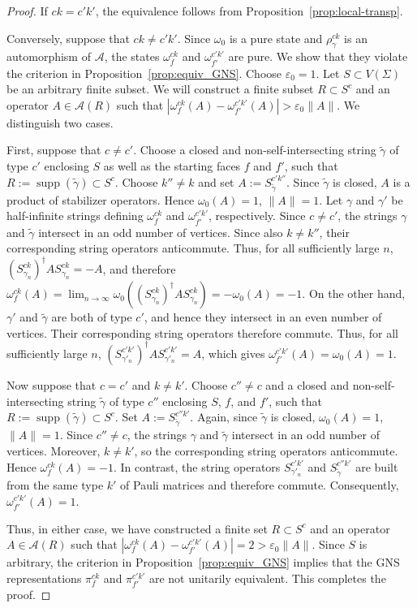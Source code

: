 \documentclass[a4paper,11pt]{article}
\theoremstyle{definition}
\theoremstyle{remark}
\theoremstyle{remark}
\begin{document}
\begin{proof}
    If $ck=c'k'$, the equivalence follows from Proposition~\ref{prop:local-transp}.

    Conversely, suppose that $ck\neq c'k'$. Since $\omega_0$ is a pure state and $\rho_\gamma^{ck}$ is an automorphism of $\mathcal{A}$, the states $\omega_f^{ck}$ and $\omega_{f'}^{c'k'}$ are pure. We show that they violate the criterion in Proposition~\ref{prop:equiv_GNS}. Choose $\varepsilon_0=1$. Let $S\subset V(\Sigma)$ be an arbitrary finite subset. We will construct a finite subset
    $R\subset S^c$ and an operator $A\in\mathcal{A}(R)$ such that $|\omega_f^{ck}(A)-\omega_{f'}^{c'k'}(A)| > \varepsilon_0\|A\|$. We distinguish two cases.

    First, suppose that $c\neq c'$. Choose a closed and non-self-intersecting string $\tilde{\gamma}$ of type $c'$ enclosing $S$ as well as the starting faces $f$ and $f'$, such that $R:=\operatorname{supp}(\tilde{\gamma})\subset S^c$. Choose $k''\neq k$ and set $A:=S_{\tilde{\gamma}}^{c'k''}$. Since $\tilde{\gamma}$ is closed, $A$ is a product of stabilizer operators. Hence $\omega_0(A)=1$, $\|A\|=1$. Let $\gamma$ and $\gamma'$ be half-infinite strings defining $\omega_f^{ck}$ and $\omega_{f'}^{c'k'}$, respectively. Since $c\neq c'$, the strings $\gamma$ and $\tilde{\gamma}$ intersect
    in an odd number of vertices. Since also $k\neq k''$, their corresponding string operators anticommute. Thus, for all sufficiently large $n$, $(S_{\gamma_n}^{ck})^\dagger A S_{\gamma_n}^{ck} = -A$, and therefore $\omega_f^{ck}(A) = \lim_{n\to\infty}\omega_0((S_{\gamma_n}^{ck})^\dagger A S_{\gamma_n}^{ck}) = -\omega_0(A) = -1$. On the other hand, $\gamma'$ and $\tilde{\gamma}$ are both of type $c'$, and hence they intersect in an even number of vertices. Their corresponding string operators therefore commute. Thus, for all sufficiently large $n$, $(S_{\gamma'_n}^{c'k'})^\dagger A S_{\gamma'_n}^{c'k'} = A$, which gives $\omega_{f'}^{c'k'}(A) = \omega_0(A) = 1$. 

    Now suppose that $c=c'$ and $k\neq k'$. Choose $c''\neq c$ and a closed and non-self-intersecting string $\tilde{\gamma}$ of type $c''$ enclosing $S$, $f$, and $f'$, such that $R:=\operatorname{supp}(\tilde{\gamma})\subset S^c$. Set $A:=S_{\tilde{\gamma}}^{c''k'}$. Again, since $\tilde{\gamma}$ is closed, $\omega_0(A)=1$, $\|A\|=1$. Since $c''\neq c$, the strings $\gamma$ and $\tilde{\gamma}$ intersect in an odd number of vertices. Moreover, $k\neq k'$, so the corresponding string operators anticommute. Hence $ \omega_f^{ck}(A)=-1$. In contrast, the string operators $S_{\gamma'_n}^{c'k'}$ and $S_{\tilde{\gamma}}^{c''k'}$ are built from the same type $k'$ of Pauli matrices and therefore commute. Consequently, $\omega_{f'}^{c'k'}(A)=1$. 

    Thus, in either case, we have constructed a finite set $R\subset S^c$ and an operator $A\in\mathcal{A}(R)$ such that $|\omega_f^{ck}(A)-\omega_{f'}^{c'k'}(A)| = 2 > \varepsilon_0\|A\|$. Since $S$ is arbitrary, the criterion in Proposition~\ref{prop:equiv_GNS} implies that the GNS representations $\pi_f^{ck}$ and $\pi_{f'}^{c'k'}$ are not unitarily equivalent. This completes the proof.
\end{proof}
\end{document}
